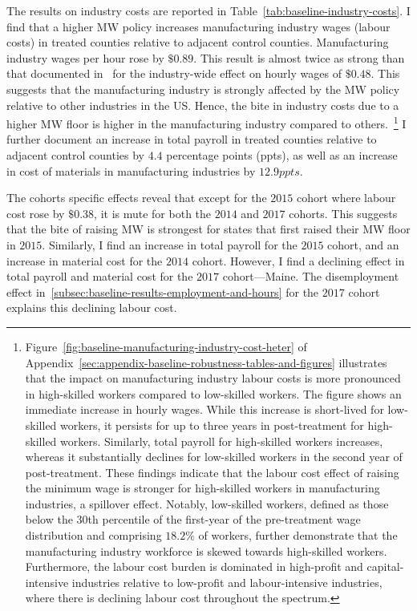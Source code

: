 \documentclass{C:/Users/david/OneDrive/Documents/ULMS/PhD/Thesis/chapter3/src/climate_change/latex/Economic_Journal/OUP-EJ}
\begin{document}
    The results on industry costs are reported in Table~\ref{tab:baseline-industry-costs}. I find that a higher MW policy increases manufacturing industry wages (labour costs) in treated counties relative to adjacent control counties. Manufacturing industry wages per hour rose by $\$0.89$. This result is almost twice as strong than that documented in~\citet{gopalan2021state} for the industry-wide effect on hourly wages of $\$0.48$. This suggests that the manufacturing industry is strongly affected by the MW policy relative to other industries in the US. Hence, the bite in industry costs due to a higher MW floor is higher in the manufacturing industry compared to others.~\footnote{\tiny Figure~\ref{fig:baseline-manufacturing-industry-cost-heter} of Appendix~\ref{sec:appendix-baseline-robustness-tables-and-figures} illustrates that the impact on manufacturing industry labour costs is more pronounced in high-skilled workers compared to low-skilled workers. The figure shows an immediate increase in hourly wages. While this increase is short-lived for low-skilled workers, it persists for up to three years in post-treatment for high-skilled workers. Similarly, total payroll for high-skilled workers increases, whereas it substantially declines for low-skilled workers in the second year of post-treatment. These findings indicate that the labour cost effect of raising the minimum wage is stronger for high-skilled workers in manufacturing industries, a spillover effect. Notably, low-skilled workers, defined as those below the 30th percentile of the first-year of the pre-treatment wage distribution and comprising $18.2\%$ of workers, further demonstrate that the manufacturing industry workforce is skewed towards high-skilled workers. Furthermore, the labour cost burden is dominated in high-profit and capital-intensive industries relative to low-profit and labour-intensive industries, where there is declining labour cost throughout the spectrum.} I further document an increase in total payroll in treated counties relative to adjacent control counties by $4.4$ percentage points (ppts), as well as an increase in cost of materials in manufacturing industries by $12.9ppts$.

    The cohorts specific effects reveal that except for the $2015$ cohort where labour cost rose by $\$0.38$, it is mute for both the $2014$ and $2017$ cohorts. This suggests that the bite of raising MW is strongest for states that first raised their MW floor in $2015$. Similarly, I find an increase in total payroll for the $2015$ cohort, and an increase in material cost for the $2014$ cohort. However, I find a declining effect in total payroll and material cost for the $2017$ cohort---Maine. The disemployment effect in~\ref{subsec:baseline-results-employment-and-hours} for the $2017$ cohort explains this declining labour cost.
    
\end{document}
